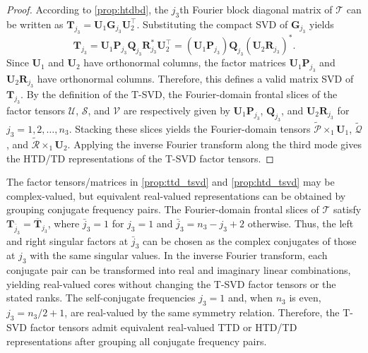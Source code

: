 \documentclass[onefignum,onetabnum]{siamart250211}
\begin{document}
\begin{proof}
    According to \cref{prop:htdbd}, the $j_3$th Fourier block diagonal matrix of $\mathscr{T}$ can be written as $\textbf{T}_{j_3}=\textbf{U}_1\textbf{G}_{j_3}\textbf{U}_2^\top$.
    Substituting the compact SVD of $\textbf{G}_{j_3}$ yields
    \begin{equation*}
        \textbf{T}_{j_3}
=
\textbf{U}_1
\textbf{P}_{j_3}
\textbf{Q}_{j_3}
\textbf{R}_{j_3}^*
\textbf{U}_2^\top
=
(\textbf{U}_1\textbf{P}_{j_3})
\textbf{Q}_{j_3}
(\textbf{U}_2\textbf{R}_{j_3})^*.
    \end{equation*}
Since $\textbf{U}_1$ and $\textbf{U}_2$ have orthonormal columns, the factor matrices $\textbf{U}_1\textbf{P}_{j_3}$ and $\textbf{U}_2\textbf{R}_{j_3}$ have orthonormal columns. Therefore, this defines a valid matrix SVD of $\textbf{T}_{j_3}$. By the definition of the T-SVD, the Fourier-domain frontal slices of the factor tensors $\mathscr{U}$, $\mathscr{S}$, and $\mathscr{V}$ are respectively given by $\textbf{U}_1\textbf{P}_{j_3}$, $\textbf{Q}_{j_3}$, and $\textbf{U}_2\textbf{R}_{j_3}$ for $j_3=1,2,\dots,n_3$. Stacking these slices yields the Fourier-domain tensors $\widetilde{\mathscr{P}}\times_1\textbf{U}_1$, $\widetilde{\mathscr{Q}}$, and $\widetilde{\mathscr{R}}\times_1\textbf{U}_2$. Applying the inverse Fourier transform along the third mode gives  the HTD/TD representations of the T-SVD factor tensors. 
\end{proof}

The factor tensors/matrices in \cref{prop:ttd_tsvd} and \cref{prop:htd_tsvd} may be complex-valued, but equivalent real-valued representations can be obtained by grouping conjugate frequency pairs. The Fourier-domain frontal slices of $\mathscr{T}$ satisfy $\textbf{T}_{\bar{j}_3}=\overline{\textbf{T}}_{j_3}$, where $\bar{j}_3=1$ for $j_3=1$ and
$\bar{j}_3=n_3-j_3+2$ otherwise. Thus, the left and right singular factors at $\bar{j}_3$ can be chosen as the complex conjugates of those at $j_3$ with the same singular values. In the inverse Fourier transform, each conjugate pair can be transformed into real and imaginary linear combinations, yielding real-valued cores without changing the T-SVD factor tensors or the stated ranks. The self-conjugate frequencies $j_3=1$ and, when $n_3$ is even, $j_3=n_3/2+1$, are real-valued by the same symmetry relation. Therefore, the T-SVD factor tensors admit equivalent real-valued TTD or HTD/TD representations after grouping all conjugate frequency pairs.
\end{document}
